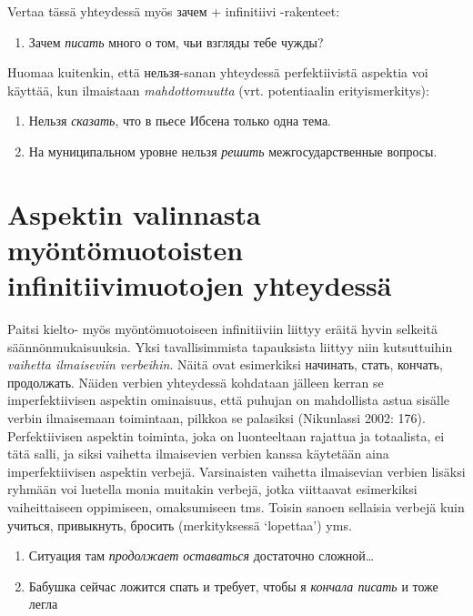 \documentclass[]{scrreprt}
\providecommand{\tightlist}{%
  \setlength{\itemsep}{0pt}\setlength{\parskip}{0pt}}
\begin{document}
Vertaa tässä yhteydessä myös зачем + infinitiivi -rakenteet:

\begin{enumerate}
\def\labelenumi{(\arabic{enumi})}
\setcounter{enumi}{330}
\tightlist
\item
  Зачем \emph{писать} много о том, чьи взгляды тебе чужды?
\end{enumerate}

Huomaa kuitenkin, että нельзя-sanan yhteydessä perfektiivistä aspektia
voi käyttää, kun ilmaistaan \emph{mahdottomuutta} (vrt. potentiaalin
erityismerkitys):

\begin{enumerate}
\def\labelenumi{(\arabic{enumi})}
\setcounter{enumi}{331}
\tightlist
\item
  Нельзя \emph{сказать}, что в пьесе Ибсена только одна тема.
\item
  На муниципальном уровне нельзя \emph{решить} межгосударственные
  вопросы.
\end{enumerate}

\section{Aspektin valinnasta myöntömuotoisten infinitiivimuotojen
yhteydessä}\label{aspektin-valinnasta-myuxf6ntuxf6muotoisten-infinitiivimuotojen-yhteydessuxe4}

Paitsi kielto- myös myöntömuotoiseen infinitiiviin liittyy eräitä hyvin
selkeitä säännönmukaisuuksia. Yksi tavallisimmista tapauksista liittyy
niin kutsuttuihin \emph{vaihetta ilmaiseviin verbeihin}. Näitä ovat
esimerkiksi начинать, стать, кончать, продолжать. Näiden verbien
yhteydessä kohdataan jälleen kerran se imperfektiivisen aspektin
ominaisuus, että puhujan on mahdollista astua sisälle verbin ilmaisemaan
toimintaan, pilkkoa se palasiksi (Nikunlassi 2002: 176). Perfektiivisen
aspektin toiminta, joka on luonteeltaan rajattua ja totaalista, ei tätä
salli, ja siksi vaihetta ilmaisevien verbien kanssa käytetään aina
imperfektiivisen aspektin verbejä. Varsinaisten vaihetta ilmaisevian
verbien lisäksi ryhmään voi luetella monia muitakin verbejä, jotka
viittaavat esimerkiksi vaiheittaiseen oppimiseen, omaksumiseen tms.
Toisin sanoen sellaisia verbejä kuin учиться, привыкнуть, бросить
(merkityksessä `lopettaa') yms.

\begin{enumerate}
\def\labelenumi{(\arabic{enumi})}
\setcounter{enumi}{333}
\tightlist
\item
  Ситуация там \emph{продолжает оставаться} достаточно сложной\ldots{}
\item
  Бабушка сейчас ложится спать и требует, чтобы я \emph{кончала писать}
  и тоже легла
\end{enumerate}
\end{document}
